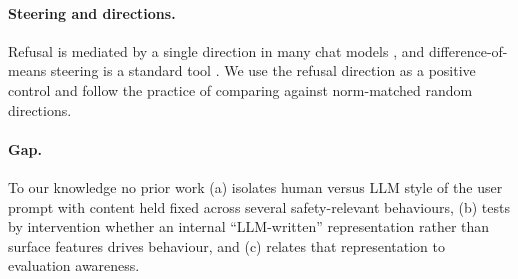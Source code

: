 \paragraph{Steering and directions.} Refusal is mediated by a single direction in many chat models \citep{arditi2024refusal}, and difference-of-means steering is a standard tool \citep{turner2023activation,rimsky2023steering}. We use the refusal direction as a positive control and follow the practice of comparing against norm-matched random directions.

\paragraph{Gap.} To our knowledge no prior work (a) isolates human versus LLM style of the user prompt with content held fixed across several safety-relevant behaviours, (b) tests by intervention whether an internal ``LLM-written'' representation rather than surface features drives behaviour, and (c) relates that representation to evaluation awareness.
